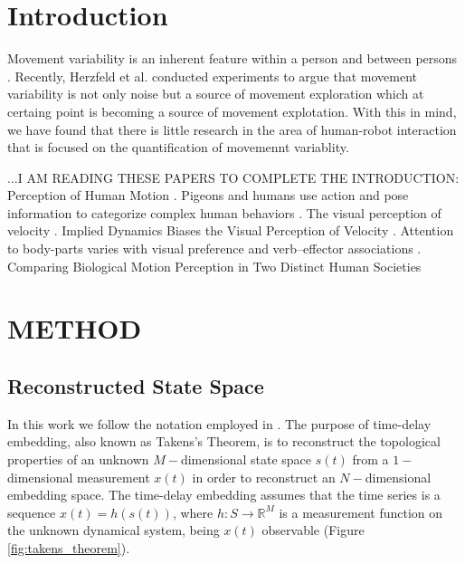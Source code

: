 \section{Introduction}



Movement variability is an inherent feature within a person and between persons
\cite{newell1993variability}. Recently, Herzfeld et al. \cite{Herzfeld2014}
conducted experiments to argue that movement variability is not only noise but a
source of movement exploration which at certaing point is becoming a source
of movement explotation.
With this in mind, we have found that there is little research in the area of
human-robot interaction that is focused on the quantification of movemennt variablity.


%
%





...I AM READING THESE PAPERS TO COMPLETE THE INTRODUCTION:
Perception of Human Motion \cite{Blake2007}.
Pigeons and humans use action and pose information to categorize complex human behaviors
\cite{Qadri201716}. The visual perception of velocity \cite{Brown1931}.
Implied Dynamics Biases the Visual Perception of Velocity \cite{LaScaleia2014}.
Attention to body-parts varies with visual preference and verb--effector associations \cite{Boyer2017}.
Comparing Biological Motion Perception in Two Distinct Human Societies \cite{Pica2011}




\section{METHOD}

\subsection{Reconstructed State Space}
In this work we follow the notation employed in \cite{Uzal2011}.
The purpose of time-delay embedding, also known as Takens's Theorem,
is to reconstruct the topological properties of an unknown $M-$dimensional
state space $s(t)$ from a $1-$dimensional measurement $x(t)$ in order to
reconstruct an $N-$dimensional embedding space.
The time-delay embedding assumes that the time series is a sequence $x(t)=h(s(t))$,
where $h: S \rightarrow \mathbb{R}^M$ is a measurement function on the unknown
dynamical system, being $x(t)$ observable (Figure \ref{fig:takens_theorem}).

